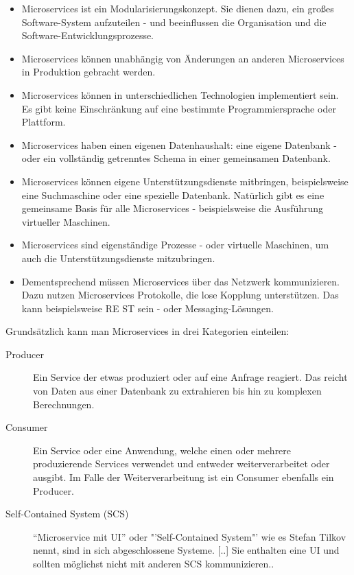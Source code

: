 \begin{itemize}
    \item Microservices ist ein Modularisierungskonzept. Sie dienen dazu, ein großes Software-System aufzuteilen - und beeinflussen die Organisation und die Software-Entwicklungsprozesse.
    \item Microservices können unabhängig von Änderungen an anderen Microservices in Produktion gebracht werden.
    \item Microservices können in unterschiedlichen Technologien implementiert sein. Es gibt keine Einschränkung auf eine bestimmte Programmiersprache oder Plattform.
    \item Microservices haben einen eigenen Datenhaushalt: eine eigene Datenbank - oder ein vollständig getrenntes Schema in einer gemeinsamen Datenbank.
    \item Microservices können eigene Unterstützungsdienste mitbringen, beispielsweise eine Suchmaschine oder eine spezielle Datenbank. Natürlich gibt es eine gemeinsame Basis für alle Microservices - beispielsweise die Ausführung virtueller Maschinen.
    \item Microservices sind eigenständige Prozesse - oder virtuelle Maschinen, um auch die Unterstützungsdienste mitzubringen.
    \item Dementsprechend müssen Microservices über das Netzwerk kommunizieren. Dazu nutzen Microservices Protokolle, die lose Kopplung unterstützen. Das kann beispielsweise RE
    ST sein - oder Messaging-Lösungen.
\end{itemize}

Grundsätzlich kann man Microservices in drei Kategorien einteilen:
\begin{description}
    \item[Producer] Ein Service der etwas produziert oder auf eine Anfrage reagiert. Das reicht von Daten aus einer Datenbank zu extrahieren bis hin zu komplexen Berechnungen.
    \item[Consumer] Ein Service oder eine Anwendung, welche einen oder mehrere produzierende Services verwendet und entweder weiterverarbeitet oder ausgibt. Im Falle der Weiterverarbeitung ist ein Consumer ebenfalls ein Producer.
    \item[Self-Contained System (SCS)] \frqq "`Microservice mit UI"' oder "'Self-Contained System"' wie es Stefan Tilkov nennt, sind in sich abgeschlossene Systeme. [..] Sie enthalten eine UI und sollten möglichst nicht mit anderen SCS kommunizieren.\flqq \cite[vgl S. 55]{EWolff2016:Microservices}.
\end{description}


